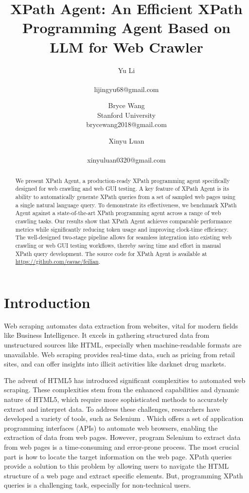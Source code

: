 \documentclass[a4paper]{article}
\title{XPath Agent: An Efficient XPath Programming Agent Based on LLM for Web Crawler}
\author{
Yu Li \\ \\ lijingyu68@gmail.com
\and
Bryce Wang \\ Stanford University  \\ brycewang2018@gmail.com
\and
Xinyu Luan \\ \\ xinyuluan0320@gmail.com
}
\begin{document}
\maketitle

\begin{abstract}
  We present XPath Agent, a production-ready XPath programming agent specifically designed for web crawling and web GUI testing. A key feature of XPath Agent is its ability to automatically generate XPath queries from a set of sampled web pages using a single natural language query. To demonstrate its effectiveness, we benchmark XPath Agent against a state-of-the-art XPath programming agent across a range of web crawling tasks. Our results show that XPath Agent achieves comparable performance metrics while significantly reducing token usage and improving clock-time efficiency. The well-designed two-stage pipeline allows for seamless integration into existing web crawling or web GUI testing workflows, thereby saving time and effort in manual XPath query development. The source code for XPath Agent is available at \url{https://github.com/eavae/feilian}.
\end{abstract}

\section{Introduction}

Web scraping \cite{khder2021web} automates data extraction from websites, vital for modern fields like Business Intelligence. It excels in gathering structured data from unstructured sources like HTML, especially when machine-readable formats are unavailable. Web scraping provides real-time data, such as pricing from retail sites, and can offer insights into illicit activities like darknet drug markets.

The advent of HTML5 \cite{TABARES2021101529} has introduced significant complexities to automated web scraping. These complexities stem from the enhanced capabilities and dynamic nature of HTML5, which require more sophisticated methods to accurately extract and interpret data. To address these challenges, researchers have developed a variety of tools, such as Selenium \cite{selenium}. Which offers a set of application programming interfaces (APIs) to automate web browsers, enabling the extraction of data from web pages. However, program Selenium to extract data from web pages is a time-consuming and error-prone process. The most crucial part is how to locate the target information on the web page. XPath queries provide a solution to this problem by allowing users to navigate the HTML structure of a web page and extract specific elements. But, programming XPath queries is a challenging task, especially for non-technical users.
\end{document}
